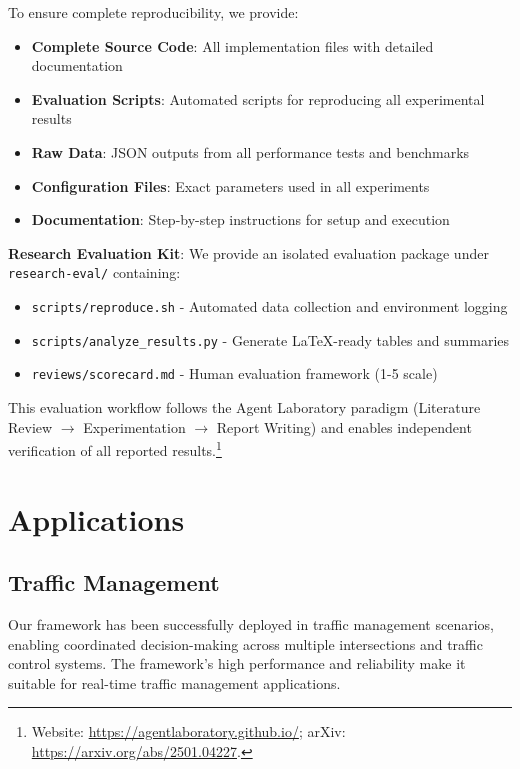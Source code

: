 \documentclass[conference]{IEEEtran}
\begin{document}
To ensure complete reproducibility, we provide:

\begin{itemize}
\item \textbf{Complete Source Code}: All implementation files with detailed documentation
\item \textbf{Evaluation Scripts}: Automated scripts for reproducing all experimental results
\item \textbf{Raw Data}: JSON outputs from all performance tests and benchmarks
\item \textbf{Configuration Files}: Exact parameters used in all experiments
\item \textbf{Documentation}: Step-by-step instructions for setup and execution
\end{itemize}

\textbf{Research Evaluation Kit}: We provide an isolated evaluation package under \texttt{research-eval/} containing:
\begin{itemize}
\item \texttt{scripts/reproduce.sh} - Automated data collection and environment logging
\item \texttt{scripts/analyze\_results.py} - Generate LaTeX-ready tables and summaries
\item \texttt{reviews/scorecard.md} - Human evaluation framework (1-5 scale)
\end{itemize}

This evaluation workflow follows the Agent Laboratory paradigm (Literature Review $\rightarrow$ Experimentation $\rightarrow$ Report Writing) and enables independent verification of all reported results.\footnote{Website: \url{https://agentlaboratory.github.io/}; arXiv: \url{https://arxiv.org/abs/2501.04227}.}

\section{Applications}

\subsection{Traffic Management}

Our framework has been successfully deployed in traffic management scenarios, enabling coordinated decision-making across multiple intersections and traffic control systems. The framework's high performance and reliability make it suitable for real-time traffic management applications.
\end{document}
